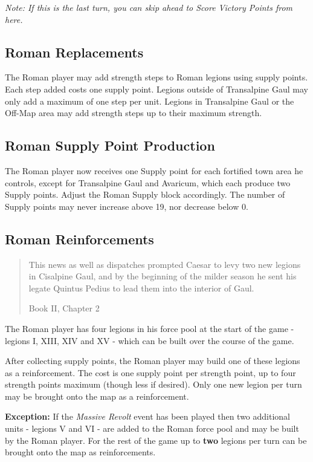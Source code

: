 \textit{Note: If this is the last turn, you can skip ahead to Score Victory Points from here.}

\subsection{Roman Replacements}
\par
The Roman player may add strength steps to Roman legions using supply points. Each step added costs one supply point. Legions outside of Transalpine Gaul may only add a maximum of one step per unit. Legions in Transalpine Gaul or the Off-Map area may add strength steps up to their maximum strength.

\subsection{Roman Supply Point Production}
\par
The Roman player now receives one Supply point for each fortified town area he controls, except for Transalpine Gaul and Avaricum, which each produce two Supply points. Adjust the Roman Supply block accordingly. The number of Supply points may never increase above 19, nor decrease below 0.

\subsection{Roman Reinforcements}\label{roman_reinforcements}
\blockquote[Book II, Chapter 2]{This news as well as dispatches prompted Caesar to levy two new legions in Cisalpine Gaul, and by the beginning of the milder season he sent his legate Quintus Pedius to lead them into the interior of Gaul.}
\par
The Roman player has four legions in his force pool at the start of the game - legions I, XIII, XIV and XV - which can be built over the course of the game.

After collecting supply points, the Roman player may build one of these legions as a reinforcement. The cost is one supply point per strength point, up to four strength points maximum (though less if desired). Only one new legion per turn may be brought onto the map as a reinforcement.

\textbf{Exception:} If the \textit{Massive Revolt} event has been played then two additional units - legions V and VI - are added to the Roman force pool and may be built by the Roman player. For the rest of the game up to \textbf{two} legions per turn can be brought onto the map as reinforcements.

